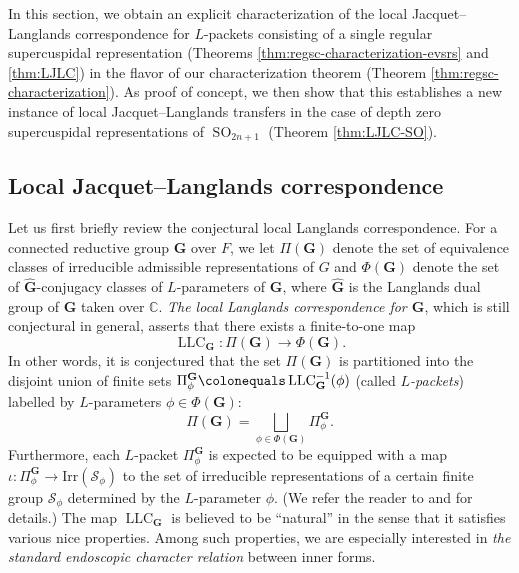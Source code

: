 \documentclass{amsart}
\newcommand{\C}{\mathbb{C}}
\newcommand{\bfG}{\mathbf{G}}
\DeclareMathOperator{\LLC}{LLC}
\DeclareMathOperator{\SO}{SO}
\theoremstyle{plain}
\theoremstyle{definition}
\theoremstyle{remark}
\theoremstyle{theorem}
\begin{document}
In this section, we obtain an explicit characterization of the local Jacquet--Langlands correspondence for $L$-packets consisting of a single regular supercuspidal representation (Theorems \ref{thm:regsc-characterization-evsrs} and \ref{thm:LJLC}) in the flavor of our characterization theorem (Theorem \ref{thm:regsc-characterization}).
As proof of concept, we then show that this establishes a new instance of local Jacquet--Langlands transfers in the case of depth zero supercuspidal representations of $\SO_{2n+1}$ (Theorem \ref{thm:LJLC-SO}).

\subsection{Local Jacquet--Langlands correspondence}\label{subsec:LJLC}
Let us first briefly review the conjectural local Langlands correspondence.
For a connected reductive group $\bfG$ over $F$, we let $\Pi(\bfG)$ denote the set of equivalence classes of irreducible admissible representations of $G$ and $\Phi(\bfG)$ denote the set of $\hat{\bfG}$-conjugacy classes of $L$-parameters of $\bfG$, where $\hat{\bfG}$ is the Langlands dual group of $\bfG$ taken over $\C$.
\textit{The local Langlands correspondence for $\bfG$}, which is still conjectural in general, asserts that there exists a finite-to-one map
\[
\LLC_{\bfG}\colon\Pi(\bfG)\rightarrow\Phi(\bfG).
\]
In other words, it is conjectured that the set $\Pi(\bfG)$ is partitioned into the disjoint union of finite sets $\Pi^{\bfG}_{\phi}\colonequals \LLC_{\bfG}^{-1}(\phi)$ (called \textit{$L$-packets}) labelled by $L$-parameters $\phi\in\Phi(\bfG)$:
\[
\Pi(\bfG)
=
\bigsqcup_{\phi\in\Phi(\bfG)}\Pi_{\phi}^{\bfG}.
\]
Furthermore, each $L$-packet $\Pi_{\phi}^{\bfG}$ is expected to be equipped with a map $\iota\colon \Pi_{\phi}^{\bfG} \rightarrow\mathrm{Irr}(\mathcal{S}_{\phi})$ to the set of irreducible representations of a certain finite group $\mathcal{S}_{\phi}$ determined by the $L$-parameter $\phi$.
(We refer the reader to \cite{Art06} and \cite{Kal16-LLC} for details.)
The map $\LLC_{\bfG}$ is believed to be ``natural'' in the sense that it satisfies various nice properties.
Among such properties, we are especially interested in \textit{the standard endoscopic character relation} between inner forms.
\end{document}
